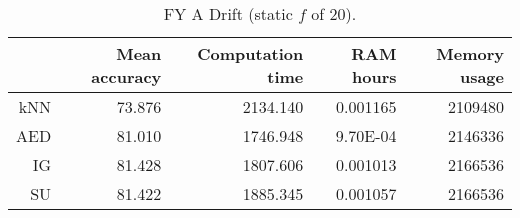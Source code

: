 \begin{table}[h]
\centering
\begin{tabular}{r|rrrr}
    & Mean accuracy & Computation time & RAM hours & Memory usage \\ \hline
kNN & 73.876                   & 2134.140         & 0.001165  & 2109480   \\
AED & 81.010                   & 1746.948         & 9.70E-04  & 2146336   \\
IG  & 81.428                   & 1807.606         & 0.001013  & 2166536   \\
SU  & 81.422                   & 1885.345         & 0.001057  & 2166536  
\end{tabular}
\caption{FY A Drift (static $f$ of 20).}
\label{Table:FY_A_Drift}
\end{table}